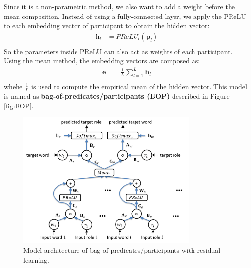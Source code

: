 \documentclass[a4paper]{article}
\begin{document}
Since it is a non-parametric method, we also want to add a weight before the mean composition. Instead of using a fully-connected layer, we apply the PReLU to each embedding vector of participant to obtain the hidden vector: 
\begin{equation} \label{eq:nonlinearity-bop}
\begin{aligned}
    \mathbf{h}_l
        &= PReLU_l(\mathbf{p}_l) \\
\end{aligned}
\end{equation}
So the parameters inside PReLU can also act as weights of each participant. Using the mean method, the embedding vectors are composed as:
\begin{equation} \label{eq:mean-comp-bop}
\begin{aligned}
    \mathbf{e}
        &= \frac{1}{L} \sum_{l=1}^{L} \mathbf{h}_{l} \\
\end{aligned}
\end{equation}
whehe $\frac{1}{L}$ is used to compute the empirical mean of the hidden vector. This model is named as \textbf{bag-of-predicates/participants (BOP)} described in Figure \ref{fig:BOP}. 


\begin{figure}[t]
\centering
\includegraphics[width=0.8\textwidth]{BOPRes.png}
\caption{\label{fig:BOPRes} Model architecture of bag-of-predicates/participants with residual learning.}
\end{figure}
\end{document}
